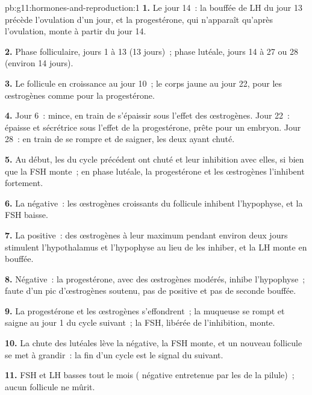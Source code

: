 \begin{solution}{pb:g11:hormones-and-reproduction:1}
\textbf{1.} Le jour 14~: la bouffée de LH du jour 13 précède
l'ovulation d'un jour, et la progestérone, qui n'apparaît qu'après
l'ovulation, monte à partir du jour 14.

\textbf{2.} Phase folliculaire, jours 1 à 13 (13 jours)~; phase
lutéale, jours 14 à 27 ou 28 (environ 14 jours).

\textbf{3.} Le follicule en croissance au jour 10~; le corps jaune au
jour 22, pour les œstrogènes comme pour la progestérone.

\textbf{4.} Jour 6~: mince, en train de s'épaissir sous l'effet des
œstrogènes. Jour 22~: épaisse et sécrétrice sous l'effet de la
progestérone, prête pour un embryon. Jour 28~: en train de se rompre et
de saigner, les deux  ayant chuté.

\textbf{5.} Au début, les  du cycle précédent ont chuté et leur
inhibition avec elles, si bien que la FSH monte~; en phase lutéale, la
progestérone et les œstrogènes l'inhibent fortement.

\textbf{6.} La  négative~: les œstrogènes croissants du
follicule inhibent l'hypophyse, et la FSH baisse.

\textbf{7.} La  positive~: des œstrogènes à leur maximum
pendant environ deux jours stimulent l'hypothalamus et l'hypophyse au
lieu de les inhiber, et la LH monte en bouffée.

\textbf{8.} Négative~: la progestérone, avec des œstrogènes modérés,
inhibe l'hypophyse~; faute d'un pic d'œstrogènes soutenu, pas de
 positive et pas de seconde bouffée.

\textbf{9.} La progestérone et les œstrogènes s'effondrent~; la
muqueuse se rompt et saigne au jour 1 du cycle suivant~; la FSH,
libérée de l'inhibition, monte.

\textbf{10.} La chute des  lutéales lève la 
négative, la FSH monte, et un nouveau follicule se met à grandir~: la
fin d'un cycle est le signal du suivant.

\textbf{11.} FSH et LH basses tout le mois ( négative
entretenue par les  de la pilule)~; aucun follicule ne mûrit.


\end{solution}
